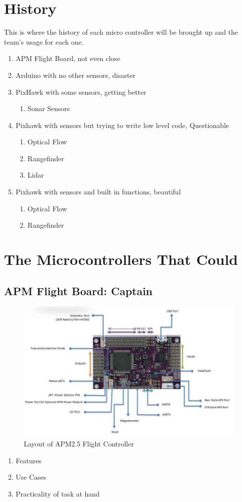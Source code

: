 \documentclass[conference,12pt, ]{IEEEtran}
\begin{document}
\section{History}
This is where the history of each micro controller will be brought up and the team's usage for each one. 
\begin{enumerate}
	\item APM Flight Board, not even close
	\item Arduino with no other sensors, disaster
	\item PixHawk with some sensors, getting better 
		\begin{enumerate}
			\item Sonar Sensors
		\end{enumerate}
	\item Pixhawk with sensors but trying to write low level code, Questionable
		\begin{enumerate}
			\item Optical Flow
			\item Rangefinder
			\item Lidar
		\end{enumerate}
	\item Pixhawk with sensors and built in functions, beautiful
		\begin{enumerate}
			\item Optical Flow
			\item Rangefinder
		\end{enumerate}
\end{enumerate}

\section{The Microcontrollers That Could}
\subsection{APM Flight Board: Captain}
\begin{figure}
	\includegraphics[scale=0.40]{apm2.jpg}
	\caption {Layout of APM2.5 Flight Controller}
\end{figure}
	\begin{enumerate}
		\item Features
		\item Use Cases
		\item Practicality of task at hand 
	\end{enumerate}
\end{document}
